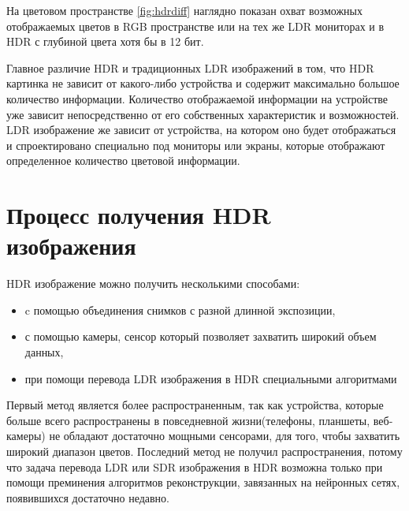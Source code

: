     На цветовом пространстве \ref{fig:hdrdiff} наглядно показан охват возможных отображаемых цветов в RGB пространстве или на тех же LDR мониторах и в HDR с глубиной цвета хотя бы в 12 бит.

\begin{figure}[ht!]
\end{figure}

    Главное различие HDR и традиционных LDR изображений\cite{bib1} в том, что HDR картинка не зависит от какого-либо устройства и содержит максимально большое количество информации. Количество отображаемой информации на устройстве уже зависит непосредственно от его собственных характеристик и возможностей. LDR изображение же зависит от устройства, на котором оно будет отображаться и спроектировано специально под мониторы или экраны, которые отображают определенное количество цветовой информации.

\section{ Процесс получения HDR изображения}

HDR изображение можно получить несколькими способами\cite{bib1}: 
\begin{itemize}
    \item c помощью объединения снимков с разной длинной экспозиции,
    \item с помощью камеры, сенсор который позволяет захватить широкий объем данных,
    \item при помощи перевода LDR изображения в HDR специальными алгоритмами
\end{itemize}

Первый метод является более распространенным, так как устройства, которые больше всего распространены в повседневной жизни(телефоны, планшеты, веб-камеры) не обладают достаточно мощными сенсорами, для того, чтобы захватить широкий диапазон цветов. Последний метод не получил распространения, потому что задача перевода LDR или SDR изображения в HDR возможна только при помощи преминения алгоритмов реконструкции, завязанных на нейронных сетях, появившихся достаточно недавно.

